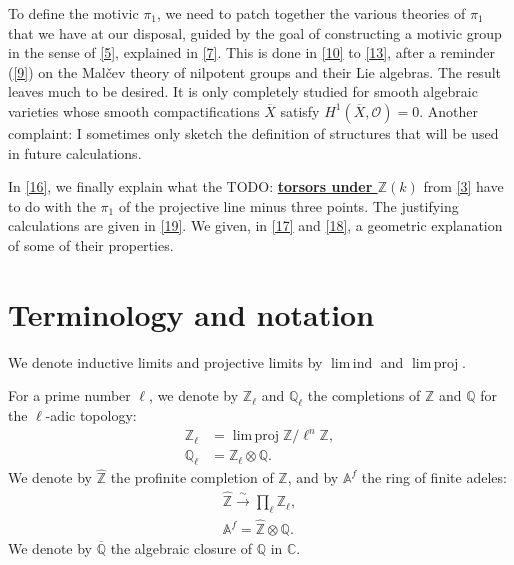 \documentclass{article}
\theoremstyle{definition}
\newenvironment{env}[1]
    {\renewcommand\theinnercustomenv{(#1)}\innercustomenv}
    {\endinnercustomenv}
\newcommand{\sh}{\mathscr}
\newcommand{\bb}{\mathbb}
\newcommand{\ZZ}{\bb{Z}}
\newcommand{\hZZ}{\widehat{\bb{Z}}}
\renewcommand{\AA}{\bb{A}}
\newcommand{\CC}{\bb{C}}
\newcommand{\QQ}{\bb{Q}}
\newcommand{\cQQ}{\overline{\QQ}}
\DeclareMathOperator{\limind}{lim\,ind}
\DeclareMathOperator{\limproj}{lim\,proj}
\newcommand{\unsure}[1]{TODO: \underline{\textbf{#1}}}
\newcommand{\oldpage}[1]{\marginpar{\footnotesize$\Big\vert$ \textit{p.~#1}}}
\begin{document}
To define the motivic $\pi_1$, we need to patch together the various theories of $\pi_1$ that we have at our disposal, guided by the goal of constructing a motivic group in the sense of \cref{5}, explained in \cref{7}.
This is done in \cref{10} to \cref{13}, after a reminder (\cref{9}) on the Mal\v{c}ev theory of nilpotent groups and their Lie algebras.
The result leaves much to be desired.
It is only completely studied for smooth algebraic varieties whose smooth compactifications $\overline{X}$ satisfy $H^1(\overline{X},\sh{O})=0$.
Another complaint: I sometimes only sketch the definition of structures that will be used in future calculations.

In \cref{16}, we finally explain what the \unsure{torsors under $\ZZ(k)$} from \cref{3} have to do with the $\pi_1$ of the projective line minus three points.
The justifying calculations are given in \cref{19}.
We given, in \cref{17} and \cref{18}, a geometric explanation of some of their properties.

\oldpage{87}
\section{Terminology and notation}
\label{0}

\begin{env}{0.1}
\label{0.1}
  We denote inductive limits and projective limits by $\limind$ and $\limproj$.
\end{env}

\begin{env}{0.2}
\label{0.2}
  For a prime number $\ell$, we denote by $\ZZ_\ell$ and $\QQ_\ell$ the completions of $\ZZ$ and $\QQ$ for the $\ell$-adic topology:
  \[
    \begin{aligned}
      \ZZ_\ell &= \limproj \ZZ/\ell^n\ZZ,
    \\\QQ_\ell &= \ZZ_\ell\otimes\QQ.
    \end{aligned}
  \]
  We denote by $\hZZ$ the profinite completion of $\ZZ$, and by $\AA^f$ the ring of finite adeles:
  \[
    \begin{gathered}
      \hZZ \xrightarrow{\sim} \prod_\ell \ZZ_\ell,
    \\\AA^f = \hZZ\otimes\QQ.
    \end{gathered}
  \]
  We denote by $\cQQ$ the algebraic closure of $\QQ$ in $\CC$.
\end{env}



\nocite{*}
\end{document}
